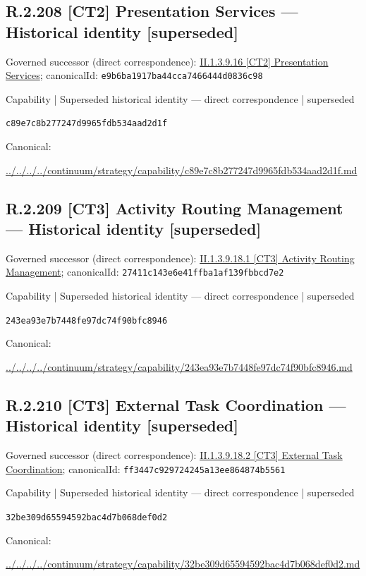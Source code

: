 \documentclass[10pt,a4paper]{article}
\begin{document}
\subsection*{R.2.208 [CT2] Presentation Services — Historical identity [superseded]}
Governed successor (direct correspondence): \hyperref[element-e9b6ba1917ba44cca7466444d0836c98]{II.1.3.9.16 [CT2] Presentation Services}; canonicalId: \texttt{e9b6ba1917ba44cca7466444d0836c98}\par
\label{element-c89e7c8b277247d9965fdb534aad2d1f}
{\small Capability | Superseded historical identity — direct correspondence | superseded}\par
\texttt{c89e7c8b277247d9965fdb534aad2d1f}\par
Canonical: \par
{\footnotesize\url{../../../../continuum/strategy/capability/c89e7c8b277247d9965fdb534aad2d1f.md}}\par
\subsection*{R.2.209 [CT3] Activity Routing Management — Historical identity [superseded]}
Governed successor (direct correspondence): \hyperref[element-27411c143e6e41ffba1af139fbbcd7e2]{II.1.3.9.18.1 [CT3] Activity Routing Management}; canonicalId: \texttt{27411c143e6e41ffba1af139fbbcd7e2}\par
\label{element-243ea93e7b7448fe97dc74f90bfc8946}
{\small Capability | Superseded historical identity — direct correspondence | superseded}\par
\texttt{243ea93e7b7448fe97dc74f90bfc8946}\par
Canonical: \par
{\footnotesize\url{../../../../continuum/strategy/capability/243ea93e7b7448fe97dc74f90bfc8946.md}}\par
\subsection*{R.2.210 [CT3] External Task Coordination — Historical identity [superseded]}
Governed successor (direct correspondence): \hyperref[element-ff3447c929724245a13ee864874b5561]{II.1.3.9.18.2 [CT3] External Task Coordination}; canonicalId: \texttt{ff3447c929724245a13ee864874b5561}\par
\label{element-32be309d65594592bac4d7b068def0d2}
{\small Capability | Superseded historical identity — direct correspondence | superseded}\par
\texttt{32be309d65594592bac4d7b068def0d2}\par
Canonical: \par
{\footnotesize\url{../../../../continuum/strategy/capability/32be309d65594592bac4d7b068def0d2.md}}\par
\end{document}
